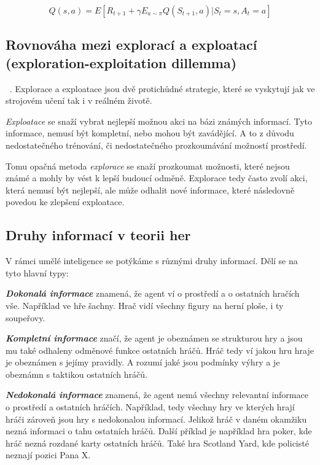 \begin{equation}
  Q(s, a) = E[R_{t+1} + \gamma E_{a\sim\pi}Q(S_{t+1}, a) | S_t = s, A_t = a]\label{eq:bellman2}
\end{equation}

\subsection{Rovnováha mezi explorací a exploatací (exploration-exploitation dillemma)}
\label{subsec:exploration-exploitation-dillemma}~\cite[Kompromis mezi potřebou získávat nové znalosti a potřebou použít již nabyté znalosti k vylepšení výkonnosti je jedním z nejzákladnějších kompromisů v přírodě]{Exploitation_Exploration}.
Explorace a exploatace jsou dvě protichůdné strategie, které se vyskytují jak ve strojovém učení tak i v reálném životě.

\emph{Exploatace} se snaží vybrat nejlepší možnou akci na bázi známých informací.
Tyto informace, nemusí být kompletní, nebo mohou být zavádějící.
A to z důvodu nedostatečného trénování, či nedostatečného prozkoumávání možností prostředí.

Tomu opačná metoda \emph{explorace} se snaží prozkoumat možnosti, které nejsou známé a mohly by vést k lepší budoucí odměně.
Explorace tedy často zvolí akci, která nemusí být nejlepší, ale může odhalit nové informace, které následovně povedou ke zlepšení exploatace.

\subsection{Druhy informací v teorii her}\label{subsec:druhy-informaci-v-teorii-her}
V rámci umělé inteligence se potýkáme s různými druhy informací.
Dělí se na tyto hlavní typy:

\textbf{\emph{Dokonalá informace}} znamená, že agent ví o prostředí a o ostatních hračích vše.
Například ve hře šachny.
Hrač vidí všechny figury na herní ploše, i ty soupeřovy.

\textbf{\emph{Kompletní informace}} značí, že agent je obeznámen se strukturou hry a jsou mu také odhaleny odměnové funkce ostatních hráčů.
Hráč tedy ví jakou hru hraje je obeznámen s jejímy pravidly.
A rozumí jaké jsou podmínky výhry a je obeznámn s taktikou ostatních hráčů.

\textbf{\emph{Nedokonalá informace}} znamená, že agent nemá všechny relevantní informace o prostředí a ostatních hráčích.
Například, tedy všechny hry ve kterých hrají hráči zároveň jsou hry s nedokonalou informací.
Jelikož hráč v daném okamžiku nezná informaci o tahu ostatních hráčů.
Další příklad je například hra poker, kde hráč nezná rozdané karty ostatních hráčů.
Také hra Scotland Yard, kde policisté neznají pozici Pana X\@.

